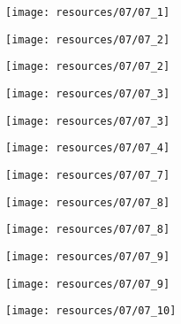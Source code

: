 \begin{frame}{ }
    \centering
    \texttt{[image: resources/07/07\_1]}
\end{frame}
\begin{frame}{ }
    \centering
    \texttt{[image: resources/07/07\_2]}
\end{frame}
\begin{frame}{ }
    \centering
    \texttt{[image: resources/07/07\_2]}
\end{frame}
\begin{frame}{ }
    \centering
    \texttt{[image: resources/07/07\_3]}
\end{frame}
\begin{frame}{ }
    \centering
    \texttt{[image: resources/07/07\_3]}
\end{frame}
\begin{frame}{ }
    \centering
    \texttt{[image: resources/07/07\_4]}
\end{frame}
\begin{frame}{ }
    \centering
    \texttt{[image: resources/07/07\_7]}
\end{frame}
\begin{frame}{ }
    \centering
    \texttt{[image: resources/07/07\_8]}
\end{frame}
\begin{frame}{ }
    \centering
    \texttt{[image: resources/07/07\_8]}
\end{frame}
\begin{frame}{ }
    \centering
    \texttt{[image: resources/07/07\_9]}
\end{frame}
\begin{frame}{ }
    \centering
    \texttt{[image: resources/07/07\_9]}
\end{frame}
\begin{frame}{ }
    \centering
    \texttt{[image: resources/07/07\_10]}
\end{frame}
